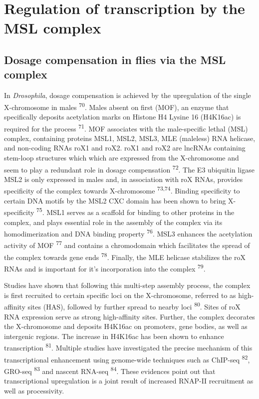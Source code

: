 \documentclass[11pt,twoside]{MPIthesis}
\theoremstyle{definition}
\theoremstyle{definition}
\theoremstyle{definition}
\theoremstyle{remark}
\begin{document}
\section{Regulation of transcription by the MSL
complex}\label{regulation-of-transcription-by-the-msl-complex}

\subsection{Dosage compensation in flies via the MSL
complex}\label{dosage-compensation-in-flies-via-the-msl-complex}

In \emph{Drosophila}, dosage compensation is achieved by the
upregulation of the single X-chromosome in males \textsuperscript{70}.
Males absent on first (MOF), an enzyme that specifically deposits
acetylation marks on Histone H4 Lysine 16 (H4K16ac) is required for the
process \textsuperscript{71}. MOF associates with the male-specific
lethal (MSL) complex, containing proteins MSL1, MSL2, MSL3, MLE
(maleless) RNA helicase, and non-coding RNAs roX1 and roX2. roX1 and
roX2 are lncRNAs containing stem-loop structures which which are
expressed from the X-chromosome and seem to play a redundant role in
dosage compensation \textsuperscript{72}. The E3 ubiquitin ligase MSL2
is only expressed in males and, in association with roX RNAs, provides
specificity of the complex towards X-chromosome \textsuperscript{73,74}.
Binding specificity to certain DNA motifs by the MSL2 CXC domain has
been shown to bring X-specificity \textsuperscript{75}. MSL1 serves as a
scaffold for binding to other proteins in the complex, and plays
essential role in the assembly of the complex via its homodimerization
and DNA binding property \textsuperscript{76}. MSL3 enhances the
acetylation activity of MOF \textsuperscript{77} and contains a
chromodomain which facilitates the spread of the complex towards gene
ends \textsuperscript{78}. Finally, the MLE helicase stabilizes the roX
RNAs and is important for it's incorporation into the complex
\textsuperscript{79}.

Studies have shown that following this multi-step assembly process, the
complex is first recruited to certain specific loci on the X-chromosome,
referred to as high-affinity sites (HAS), followed by further spread to
nearby loci \textsuperscript{80}. Sites of roX RNA expression serve as
strong high-affinity sites. Further, the complex decorates the
X-chromosome and deposits H4K16ac on promoters, gene bodies, as well as
intergenic regions. The increase in H4K16ac has been shown to enhance
transcription \textsuperscript{81}. Multiple studies have investigated
the precise mechanism of this transcriptional enhancement using
genome-wide techniques such as ChIP-seq \textsuperscript{82}, GRO-seq
\textsuperscript{83} and nascent RNA-seq \textsuperscript{84}. These
evidences point out that transcriptional upregulation is a joint result
of increased RNAP-II recruitment as well as processivity.
\end{document}
